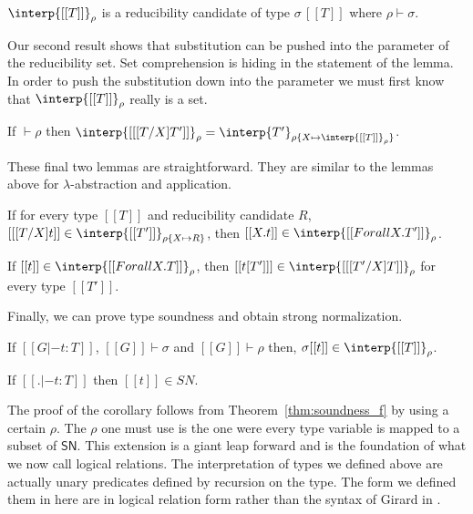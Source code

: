 \begin{lemma}
  \label{lemma:sn_f_cand}
  $\interp{[[T]]}_\rho$ is a reducibility candidate of type $\sigma\,[[T]]$ 
  where $\rho \vdash \sigma$.
\end{lemma}
\noindent
Our second result shows that substitution can be pushed into the
parameter of the reducibility set.  Set comprehension is hiding in
the statement of the lemma.  In order to push the substitution down into
the parameter we must first know that $\interp{[[T]]}_\rho$ really is
a set.
\begin{lemma}
  \label{lemma:red_subst}
  If $\vdash \rho$ then $\interp{[[ [T/X]T']]}_\rho = \interp{T'}_{\rho\{ X \mapsto \interp{[[T]]}_\rho\}}$.
\end{lemma}
\noindent
These final two lemmas are straightforward.  They are similar to the
lemmas above for $\lambda$-abstraction and application.
\begin{lemma}
  \label{lemma:red_f_univ_abs}
  If for every type $[[T]]$ and reducibility candidate $R$, $[[ [T/X]t]] \in \interp{[[T']]}_{\rho\{X \mapsto R\}}$, then
  $[[\\ X.t]] \in \interp{[[Forall X.T']]}_\rho$.
\end{lemma}

\begin{lemma}
  \label{lemma:red_f_univ_app}
  If $[[t]] \in \interp{[[Forall X.T]]}_\rho$, then $[[t [T'] ]] \in \interp{[[ [T'/X]T]]}_\rho$ for every type $[[T']]$.
\end{lemma}
\noindent
Finally, we can prove type soundness and obtain strong normalization.
\begin{thm}
  \label{thm:soundness_f}
  If $[[G |- t : T]]$, $[[G]] \vdash \sigma$ and $[[G]] \vdash \rho$ then,
  $\sigma [[t]] \in \interp{[[T]]}_{\rho}$.
\end{thm}

\begin{corollary}
  \label{corollary:sn_f}
  If $[[. |- t : T]]$ then $[[t]] \in SN$.
\end{corollary}
\noindent
The proof of the corollary follows from Theorem~\ref{thm:soundness_f}
by using a certain $\rho$.  The $\rho$ one must use is the one were
every type variable is mapped to a subset of $\mathsf{SN}$.  This
extension is a giant leap forward and is the foundation of what we now
call logical relations.  The interpretation of types we defined above
are actually unary predicates defined by recursion on the type.  The
form we defined them in here are in logical relation form rather than
the syntax of Girard in \cite{Girard:1989}.
